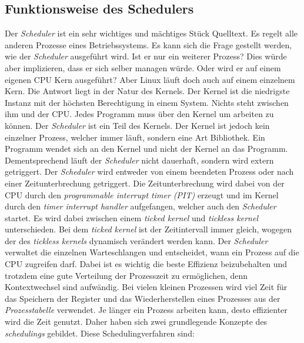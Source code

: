 \newpage

\subsection{Funktionsweise des Schedulers}
Der \textit{Scheduler} ist ein sehr wichtiges und mächtiges Stück Quelltext. Es regelt alle anderen Prozesse eines Betriebssystems. Es kann sich die Frage gestellt werden, wie der \textit{Scheduler} ausgeführt wird. Ist er nur ein weiterer Prozess? Dies würde aber implizieren, dass er sich selber managen würde. Oder wird er auf einem eigenen CPU Kern ausgeführt? Aber Linux läuft doch auch auf einem einzelnem Kern. Die Antwort liegt in der Natur des Kernels.
\medskip
\newline
Der Kernel ist die niedrigste Instanz mit der höchsten Berechtigung in einem System. Nichts steht zwischen ihm und der CPU. Jedes Programm muss über den Kernel um arbeiten zu können. Der \textit{Scheduler} ist ein Teil des Kernels. Der Kernel ist jedoch kein einzelner Prozess, welcher immer läuft, sondern eine Art Bibliothek. Ein Programm wendet sich an den Kernel und nicht der Kernel an das Programm. Dementsprechend läuft der \textit{Scheduler} nicht dauerhaft, sondern wird extern getriggert. Der \textit{Scheduler} wird entweder von einem beendeten Prozess oder nach einer Zeitunterbrechung getriggert. Die Zeitunterbrechung wird dabei von der CPU durch den \textit{programmable interrupt timer (PIT)} erzeugt und im Kernel durch den \textit{timer interrupt handler} aufgefangen, welcher auch den \textit{Scheduler} startet. Es wird dabei zwischen einem \textit{ticked kernel} und \textit{tickless kernel} unterschieden. Bei dem \textit{ticked kernel} ist der Zeitintervall immer gleich, wogegen der des \textit{tickless kernels} dynamisch verändert werden kann.\cite{tickles:Love}
\bigskip
\newline
Der \textit{Scheduler} verwaltet die einzelnen Warteschlangen und entscheidet, wann ein Prozess auf die CPU zugreifen darf. Dabei ist es wichtig die beste Effizienz beizubehalten und trotzdem eine gute Verteilung der Prozesszeit zu ermöglichen, denn Kontextwechsel sind aufwändig. Bei vielen kleinen Prozessen wird viel Zeit für das Speichern der Register und das Wiederherstellen eines Prozesses aus der \textit{Prozesstabelle} verwendet. Je länger ein Prozess arbeiten kann, desto effizienter wird die Zeit genutzt. Daher haben sich zwei grundlegende Konzepte des \textit{schedulings} gebildet. Diese Schedulingverfahren sind:
